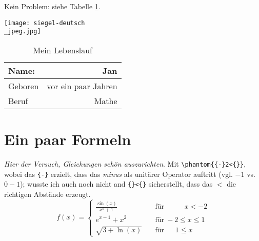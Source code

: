 \documentclass[12pt]{scrartcl}
\begin{document}
Kein Problem: siehe Tabelle \ref{tab:meinlebenslauf}.

\begin{table}[t]
  \texttt{[image: siegel-deutsch\\\_jpeg.jpg]}

  \begin{tabular}{|l|r|}
    \hline
    \textbf{Name:} & Jan \\
    \hline
    \hline
    Geboren & vor ein paar Jahren\footnotemark \\
    \hline
    Beruf & Mathe\\
    \hline
  \end{tabular}
  \caption{Mein Lebenslauf}
  \label{tab:meinlebenslauf}
\end{table}

\section{Ein paar Formeln}

\textit{Hier der Versuch, Gleichungen sch\"on auszurichten}. Mit
\verb$\phantom{{-}2<{}}$, wobei das \verb${-}$ erzielt, dass das \emph{minus}
  als unit\"arer Operator auftritt (vgl. ${-}1$ vs. $0-1$); wusste ich auch
  noch nicht and \verb${}<{}$ sicherstellt, dass das $<$ die richtigen
  Abst\"ande erzeugt.
\begin{equation*}
  f(x) =
  \begin{cases}
    \frac{\sin(x)}{x^2+1}\phantom{\sqrt{1}}\quad &\text{f\"ur}\ \phantom{{-}2<{}} x < -2 \\
    e^{x-1} + x^2 \quad &\text{f\"ur}\ {-}2 \leq x \leq 1 \\
    \sqrt{3 + \ln(x)} \quad & \text{f\"ur } \phantom{{-}}1 \leq x
  \end{cases}
\end{equation*}
\end{document}
